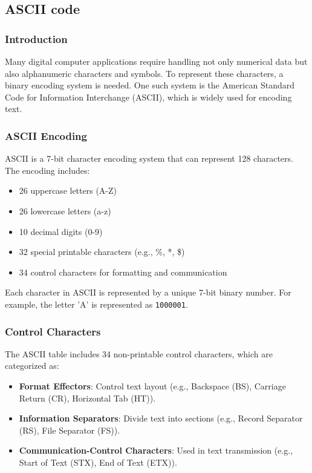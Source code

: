 \documentclass[a4paper,12pt]{article}
\begin{document}
\subsection{ASCII code}
\subsubsection{Introduction}
Many digital computer applications require handling not only numerical data but also alphanumeric characters and symbols. To represent these characters, a binary encoding system is needed. One such system is the American Standard Code for Information Interchange (ASCII), which is widely used for encoding text.

\subsubsection{ASCII Encoding}
ASCII is a 7-bit character encoding system that can represent 128 characters. The encoding includes:
\begin{itemize}
    \item 26 uppercase letters (A-Z)
    \item 26 lowercase letters (a-z)
    \item 10 decimal digits (0-9)
    \item 32 special printable characters (e.g., \%, *, \$)
    \item 34 control characters for formatting and communication
\end{itemize}

Each character in ASCII is represented by a unique 7-bit binary number. For example, the letter 'A' is represented as \texttt{1000001}.

\subsubsection{Control Characters}
The ASCII table includes 34 non-printable control characters, which are categorized as:
\begin{itemize}
    \item \textbf{Format Effectors}: Control text layout (e.g., Backspace (BS), Carriage Return (CR), Horizontal Tab (HT)).
    \item \textbf{Information Separators}: Divide text into sections (e.g., Record Separator (RS), File Separator (FS)).
    \item \textbf{Communication-Control Characters}: Used in text transmission (e.g., Start of Text (STX), End of Text (ETX)).
\end{itemize}
\end{document}
